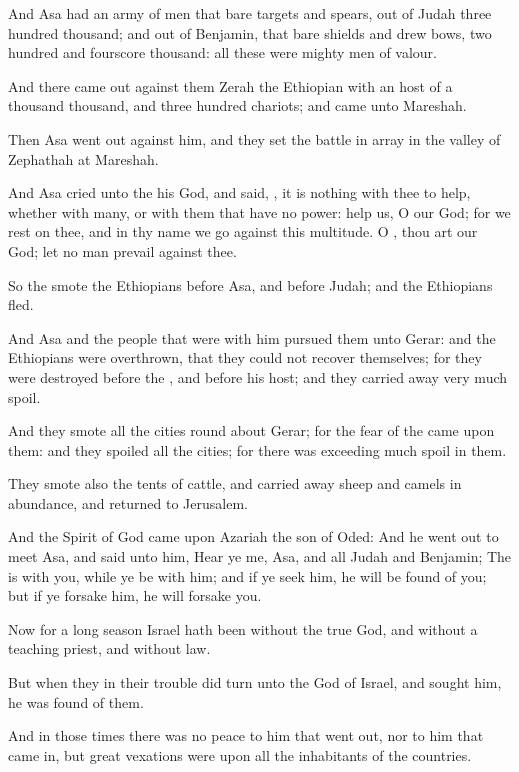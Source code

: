 \Verse And Asa had an army of men that bare targets and spears, out of Judah three hundred thousand; and out of Benjamin, that bare shields and drew bows, two hundred and fourscore thousand: all these were mighty men of valour.

\Verse And there came out against them Zerah the Ethiopian with an host of a thousand thousand, and three hundred chariots; and came unto Mareshah.

\Verse Then Asa went out against him, and they set the battle in array in the valley of Zephathah at Mareshah.

\Verse And Asa cried unto the \LORD his God, and said, \LORD, it is nothing with thee to help, whether with many, or with them that have no power: help us, O \LORD our God; for we rest on thee, and in thy name we go against this multitude. O \LORD, thou art our God; let no man prevail against thee.

\Verse So the \LORD smote the Ethiopians before Asa, and before Judah; and the Ethiopians fled.

\Verse And Asa and the people that were with him pursued them unto Gerar: and the Ethiopians were overthrown, that they could not recover themselves; for they were destroyed before the \LORD, and before his host; and they carried away very much spoil.

\Verse And they smote all the cities round about Gerar; for the fear of the \LORD came upon them: and they spoiled all the cities; for there was exceeding much spoil in them.

\Verse They smote also the tents of cattle, and carried away sheep and camels in abundance, and returned to Jerusalem.


\Chapter
\Verse And the Spirit of God came upon Azariah the son of Oded: \Verse And he went out to meet Asa, and said unto him, Hear ye me, Asa, and all Judah and Benjamin; The \LORD is with you, while ye be with him; and if ye seek him, he will be found of you; but if ye forsake him, he will forsake you.

\Verse Now for a long season Israel hath been without the true God, and without a teaching priest, and without law.

\Verse But when they in their trouble did turn unto the \LORD God of Israel, and sought him, he was found of them.

\Verse And in those times there was no peace to him that went out, nor to him that came in, but great vexations were upon all the inhabitants of the countries.


